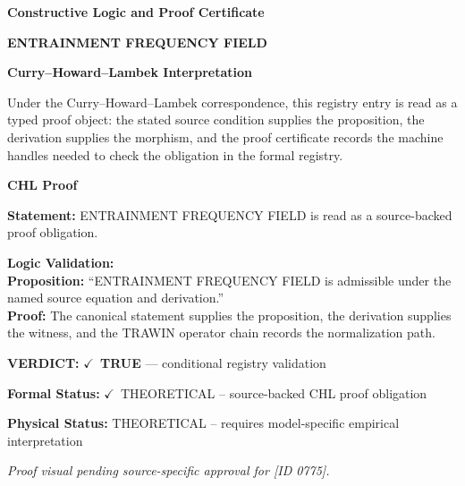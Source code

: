 \clearpage
\begingroup\tzpsupportsetup
\noindent\textbf{\fontsize{10.8pt}{12.8pt}\selectfont [ID 0775] Constructive Logic and Proof Certificate}\par
\noindent\textbf{\fontsize{10pt}{12pt}\selectfont ENTRAINMENT FREQUENCY FIELD}\par
\vspace{0.45em}
\begingroup
\footnotesize
\setlength{\parskip}{0.22em}
\setlength{\parindent}{0pt}
\noindent\textbf{Curry--Howard--Lambek Interpretation}\par
Under the Curry--Howard--Lambek correspondence, this registry entry is read as a typed proof
object: the stated source condition supplies the proposition, the derivation supplies the
morphism, and the proof certificate records the machine handles needed to check the obligation
in the formal registry.

\vspace{0.45em}
\noindent\textbf{CHL Proof}\par
\textbf{Statement:} ENTRAINMENT FREQUENCY FIELD is read as a source-backed proof obligation.

\textbf{Logic Validation:}\\
\textbf{Proposition:} ``ENTRAINMENT FREQUENCY FIELD is admissible under the named source equation and derivation.''\\
\textbf{Proof:} The canonical statement supplies the proposition, the derivation supplies the witness, and the TRAWIN operator chain records the normalization path.

\textbf{VERDICT:} \ensuremath{\checkmark}\ \textbf{TRUE} --- conditional registry validation

\textbf{Formal Status:} \ensuremath{\checkmark}\ THEORETICAL -- source-backed CHL proof obligation

\textbf{Physical Status:} THEORETICAL -- requires model-specific empirical interpretation
\par\vspace{0.45em}
\par
\vfill
\begingroup\footnotesize\itshape
Proof visual pending source-specific approval for [ID 0775].
\par\endgroup
\vfill
\endgroup
\endgroup
